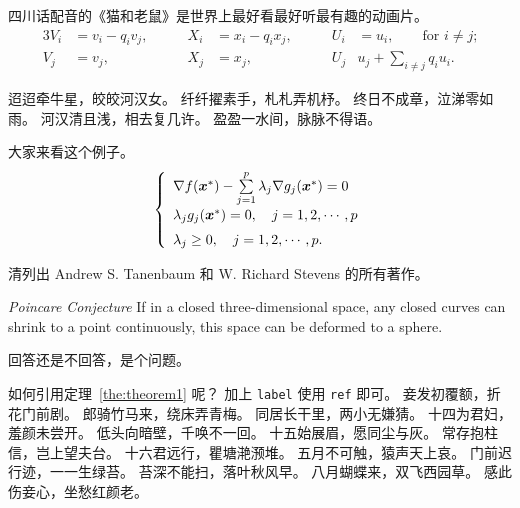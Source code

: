 \documentclass[../Main/thesis.tex]{subfiles}
\begin{document}
\begin{corollary}
  四川话配音的《猫和老鼠》是世界上最好看最好听最有趣的动画片。
  \begin{alignat}{3}
    V_i & =v_i - q_i v_j, & \qquad X_i                   & = x_i - q_i x_j,
        & \qquad U_i      & = u_i,
    \qquad \text{for $i\ne j$;}\label{eq:B}                                 \\
    V_j & = v_j,          & \qquad X_j                   & = x_j,
        & \qquad U_j      & u_j + \sum_{i\ne j} q_i u_i.
  \end{alignat}
\end{corollary}

迢迢牵牛星，皎皎河汉女。
纤纤擢素手，札札弄机杼。
终日不成章，泣涕零如雨。
河汉清且浅，相去复几许。
盈盈一水间，脉脉不得语。

\begin{example}
  大家来看这个例子。
  \begin{equation}
    \label{ktc}
    \left\{\begin{array}{l}
      \nabla f({\mbox{\boldmath $x$}}^*)-\sum\limits_{j=1}^p\lambda_j\nabla g_j({\mbox{\boldmath $x$}}^*)=0 \\[0.3cm]
      \lambda_jg_j({\mbox{\boldmath $x$}}^*)=0,\quad j=1,2,\cdots,p                                         \\[0.2cm]
      \lambda_j\ge 0,\quad j=1,2,\cdots,p.
    \end{array}\right.
  \end{equation}
\end{example}

\begin{exercise}
  清列出 Andrew S. Tanenbaum 和 W. Richard Stevens 的所有著作。
\end{exercise}

\begin{conjecture} \textit{Poincare Conjecture}
  If in a closed three-dimensional space, any closed curves can shrink to a point continuously, this space can be
  deformed to a sphere.
\end{conjecture}

\begin{problem}
回答还是不回答，是个问题。
\end{problem}

如何引用定理~\ref{the:theorem1} 呢？
加上 \verb|label| 使用 \verb|ref| 即可。
妾发初覆额，折花门前剧。
郎骑竹马来，绕床弄青梅。
同居长干里，两小无嫌猜。
十四为君妇，羞颜未尝开。
低头向暗壁，千唤不一回。
十五始展眉，愿同尘与灰。
常存抱柱信，岂上望夫台。
十六君远行，瞿塘滟滪堆。
五月不可触，猿声天上哀。
门前迟行迹，一一生绿苔。
苔深不能扫，落叶秋风早。
八月蝴蝶来，双飞西园草。
感此伤妾心，坐愁红颜老。
\end{document}
